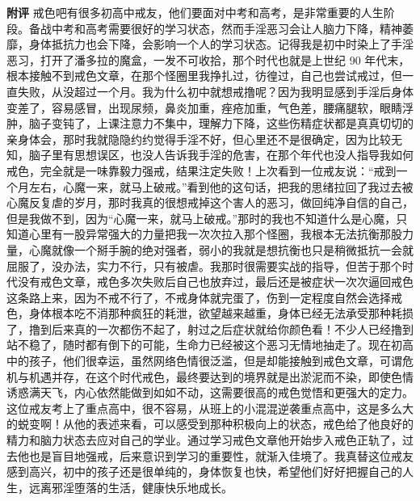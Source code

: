 \begin{case}
    \textbf{附评} 戒色吧有很多初高中戒友，他们要面对中考和高考，是非常重要的人生阶段。备战中考和高考需要很好的学习状态，然而手淫恶习会让人脑力下降，精神萎靡，身体抵抗力也会下降，会影响一个人的学习状态。记得我是初中时染上了手淫恶习，打开了潘多拉的魔盒，一发不可收拾，那个时代也就是上世纪 90 年代末，根本接触不到戒色文章，在那个怪圈里我挣扎过，彷徨过，自己也尝试戒过，但一直失败，从没超过一个月。我为什么初中就想戒撸呢？因为我明显感到手淫后身体变差了，容易感冒，出现尿频，鼻炎加重，痤疮加重，气色差，腰痛腿软，眼睛浮肿，脑子变钝了，上课注意力不集中，理解力下降，这些伤精症状都是真真切切的亲身体会，那时我就隐隐约约觉得手淫不好，但心里还不是很确定，因为比较无知，脑子里有思想误区，也没人告诉我手淫的危害，在那个年代也没人指导我如何戒色，完全就是一味靠毅力强戒，结果注定失败！上次看到一位戒友说：“戒到一个月左右，心魔一来，就马上破戒。”看到他的这句话，把我的思绪拉回了我过去被心魔反复虐的岁月，那时我真的很想戒掉这个害人的恶习，做回纯净自信的自己，但是我做不到，因为“心魔一来，就马上破戒。”那时的我也不知道什么是心魔，只知道心里有一股异常强大的力量把我一次次拉入那个怪圈，我根本无法抗衡那股力量，心魔就像一个掰手腕的绝对强者，弱小的我就是想抗衡也只是稍微抵抗一会就屈服了，没办法，实力不行，只有被虐。我那时很需要实战的指导，但苦于那个时代没有戒色文章，戒色多次失败后自己也放弃过，最后还是被症状一次次逼回戒色这条路上来，因为不戒不行了，不戒身体就完蛋了，伤到一定程度自然会选择戒色，身体根本吃不消那种疯狂的耗泄，欲望越来越重，身体已经无法承受那种耗损了，撸到后来真的一次都伤不起了，射过之后症状就给你颜色看！不少人已经撸到站不稳了，随时都有倒下的可能，生命力已经被这个恶习无情地抽走了。现在初高中的孩子，他们很幸运，虽然网络色情很泛滥，但是却能接触到戒色文章，可谓危机与机遇并存，在这个时代戒色，最终要达到的境界就是出淤泥而不染，即使色情诱惑满天飞，内心依然能做到如如不动，这需要很高的戒色觉悟和更强大的定力。这位戒友考上了重点高中，很不容易，从班上的小混混逆袭重点高中，这是多么大的蜕变啊！从他的表述来看，可以感受到那种积极向上的状态，戒色给了他良好的精力和脑力状态去应对自己的学业。通过学习戒色文章他开始步入戒色正轨了，过去他也是盲目地强戒，后来意识到学习的重要性，就渐入佳境了。我真替这位戒友感到高兴，初中的孩子还是很单纯的，身体恢复也快，希望他们好好把握自己的人生，远离邪淫堕落的生活，健康快乐地成长。
\end{case}

